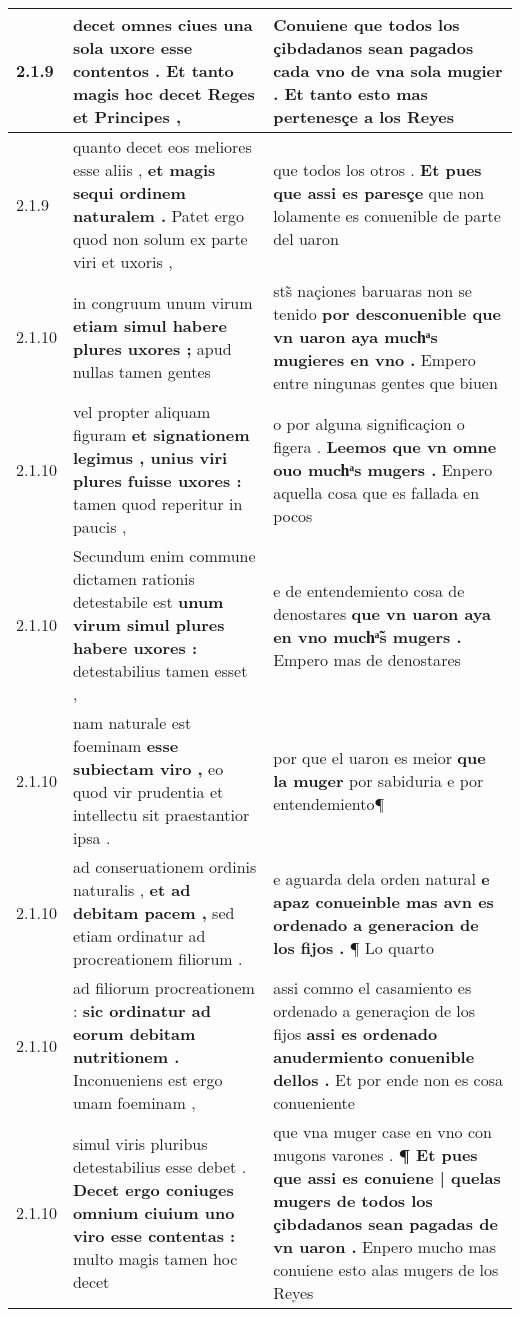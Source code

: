 \begin{tabular}{|p{1cm}|p{6.5cm}|p{6.5cm}|}
2.1.9 & decet omnes ciues \textbf{ una sola uxore esse contentos . } Et tanto magis hoc decet Reges et Principes , & Conuiene que todos los çibdadanos sean pagados \textbf{ cada vno de vna sola mugier . } Et tanto esto mas pertenesçe a los Reyes \\\hline
2.1.9 & quanto decet eos meliores esse aliis , \textbf{ et magis sequi ordinem naturalem . } Patet ergo quod non solum ex parte viri et uxoris , & que todos los otros . \textbf{ Et pues que assi es paresçe } que non lolamente es conuenible de parte del uaron \\\hline
2.1.10 & in congruum unum virum \textbf{ etiam simul habere plures uxores ; } apud nullas tamen gentes & sts̃ naçiones baruaras non se tenido \textbf{ por desconuenible que vn uaron aya muchͣs mugieres en vno . } Empero entre ningunas gentes que biuen \\\hline
2.1.10 & vel propter aliquam figuram \textbf{ et signationem legimus , unius viri plures fuisse uxores : } tamen quod reperitur in paucis , & o por alguna significaçion o figera . \textbf{ Leemos que vn omne ouo muchͣs mugers . } Enpero aquella cosa que es fallada en pocos \\\hline
2.1.10 & Secundum enim commune dictamen rationis detestabile est \textbf{ unum virum simul plures habere uxores : } detestabilius tamen esset , & e de entendemiento cosa de denostares \textbf{ que vn uaron aya en vno muchͣ̃s mugers . } Empero mas de denostares \\\hline
2.1.10 & nam naturale est foeminam \textbf{ esse subiectam viro , } eo quod vir prudentia et intellectu sit praestantior ipsa . & por que el uaron es meior \textbf{ que la muger } por sabiduria e por entendemiento¶ \\\hline
2.1.10 & ad conseruationem ordinis naturalis , \textbf{ et ad debitam pacem , } sed etiam ordinatur ad procreationem filiorum . & e aguarda dela orden natural \textbf{ e apaz conueinble mas avn es ordenado a generacion de los fijos . } ¶ Lo quarto \\\hline
2.1.10 & ad filiorum procreationem : \textbf{ sic ordinatur ad eorum debitam nutritionem . } Inconueniens est ergo unam foeminam , & assi commo el casamiento es ordenado a generaçion de los fijos \textbf{ assi es ordenado anudermiento conuenible dellos . } Et por ende non es cosa conueniente \\\hline
2.1.10 & simul viris pluribus detestabilius esse debet . \textbf{ Decet ergo coniuges omnium ciuium uno viro esse contentas : } multo magis tamen hoc decet & que vna muger case en vno con mugons varones . \textbf{ ¶ Et pues que assi es conuiene | quelas mugers de todos los çibdadanos sean pagadas de vn uaron . } Enpero mucho mas conuiene esto alas mugers de los Reyes \\\hline

\end{tabular}
